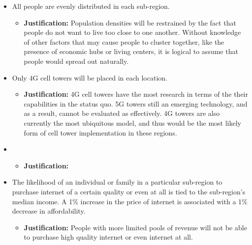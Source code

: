 \documentclass[12pt]{article}
\begin{document}
\begin{itemize}
    \item All people are evenly distributed in each sub-region.
    \begin{itemize} 
        \item \textbf{Justification:} 
        Population densities will be restrained by the fact that people do not want to live too close to one another. Without knowledge of other factors that may cause people to cluster together, like the presence of economic hubs or living centers, it is logical to assume that people would spread out naturally. 
    \end{itemize}
    \item Only 4G cell towers will be placed in each location.
    \begin{itemize} 
        \item \textbf{Justification:} 4G cell towers have the most research in terms of the their capabilities in the status quo. 5G towers still an emerging technology, and as a result, cannot be evaluated as effectively. 4G towers are also currently the most ubiquitous model, and thus would be the most likely form of cell tower implementation in these regions. 
    \end{itemize}
\end{itemize}
\begin{itemize}
    \item 
    \begin{itemize} 
        \item \textbf{Justification:} 
    \end{itemize}
    \item The likelihood of an individual or family in a particular sub-region to purchase internet of a certain quality or even at all is tied to the sub-region's median income. A 1\% increase in the price of internet is associated with a 1\% decrease in affordability. 
    \begin{itemize} 
        \item \textbf{Justification:} People with more limited pools of revenue will not be able to purchase high quality internet or even internet at all.
    \end{itemize}
\end{itemize}
\end{document}
